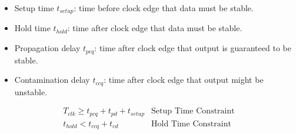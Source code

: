 \documentclass[8pt]{article}
\begin{document}
\begin{itemize}
    \item Setup time $t_{setup}$: time before clock edge that data must be
          stable.
    \item Hold time $t_{hold}$: time after clock edge that data must be stable.
    \item Propagation delay $t_{pcq}$: time after clock edge that output
          is guaranteed to be stable.
    \item Contamination delay $t_{ccq}$: time after clock edge that output
          might be unstable.
\end{itemize}

\begin{align}
    T_{clk} \geq t_{pcq} + t_{pd} + t_{setup} & \text{Setup Time Constraint} \\
    t_{hold} < t_{ccq} + t_{cd}               & \text{Hold Time Constraint}
\end{align}
\end{document}
